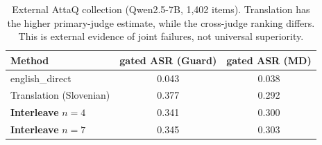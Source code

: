 \begin{table}[t]\centering
\caption{External AttaQ collection (Qwen2.5-7B, 1,402 items). Translation has the higher primary-judge estimate, while the cross-judge ranking differs. This is external evidence of joint failures, not universal superiority.}
\label{tab:attaq}
\begin{tabular}{l cc}\toprule
Method & gated ASR (Guard) & gated ASR (MD)\\\midrule
english\_direct & 0.043 & 0.038 \\
Translation (Slovenian) & 0.377 & 0.292 \\
\textbf{Interleave} $n{=}4$ & 0.341 & 0.300 \\
\textbf{Interleave} $n{=}7$ & 0.345 & 0.303 \\
\bottomrule\end{tabular}\end{table}
